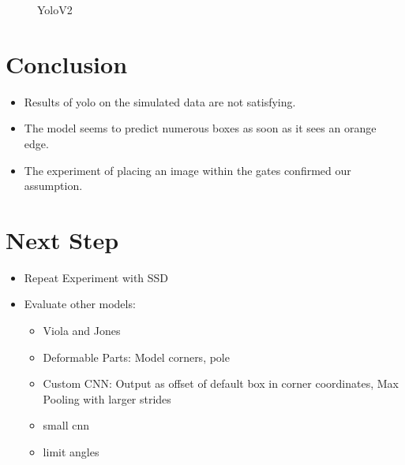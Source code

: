 \documentclass{article}
\begin{document}
\begin{figure}
\begin{minipage}{0.3\textwidth}
	\end{minipage}
	\caption{YoloV2}
	\label{fig:examples_cat}
\end{figure} 
\newpage
\section{Conclusion}

\begin{itemize}
	\item Results of yolo on the simulated data are not satisfying.
	\item The model seems to predict numerous boxes as soon as it sees an orange edge.
	\item The experiment of placing an image within the gates confirmed our assumption.
\end{itemize}

\section{Next Step}
\begin{itemize}
	\item Repeat Experiment with SSD
	\item Evaluate other models:
	\begin{itemize}
		\item Viola and Jones
		\item Deformable Parts: Model corners, pole 
		\item Custom CNN: Output as offset of default box in corner coordinates, Max Pooling with larger strides
		\item small cnn
		\item limit angles
	\end{itemize} 
\end{itemize}







\end{document}
